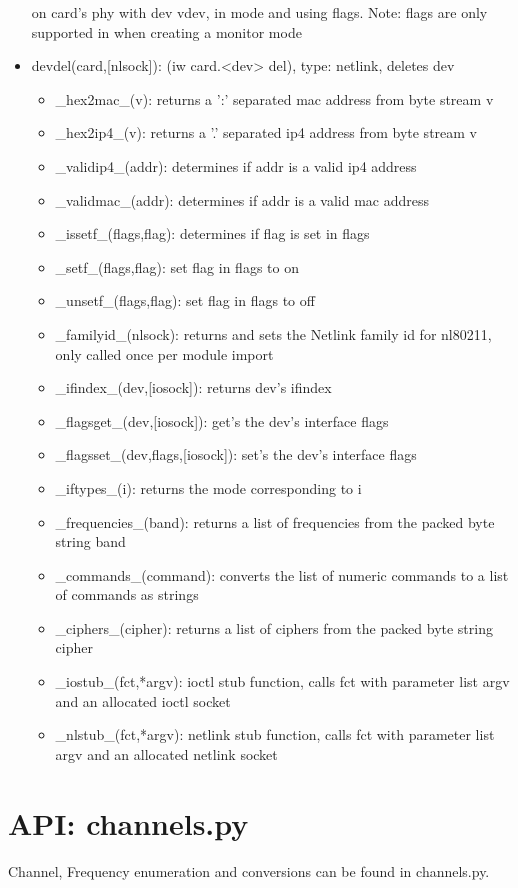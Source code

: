 \documentclass[11pt]{article}
\begin{document}
\begin{appendices}
\begin{itemize}
on card's phy with dev vdev, in mode and using flags. Note: flags are only supported
in when creating a monitor mode
\item devdel(card,[nlsock]): (iw card.<dev> del), type: netlink, deletes dev
\begin{itemize}
\item \_hex2mac\_(v): returns a ':' separated mac address from byte stream v
\item \_hex2ip4\_(v): returns a '.' separated ip4 address from byte stream v
\item \_validip4\_(addr): determines if addr is a valid ip4 address
\item \_validmac\_(addr): determines if addr is a valid mac address
\item \_issetf\_(flags,flag): determines if flag is set in flags
\item \_setf\_(flags,flag): set flag in flags to on
\item \_unsetf\_(flags,flag): set flag in flags to off
\item \_familyid\_(nlsock): returns and sets the Netlink family id for nl80211, 
only called once per module import
\item \_ifindex\_(dev,[iosock]): returns dev's ifindex
\item \_flagsget\_(dev,[iosock]): get's the dev's interface flags
\item \_flagsset\_(dev,flags,[iosock]): set's the dev's interface flags
\item \_iftypes\_(i): returns the mode corresponding to i
\item \_frequencies\_(band): returns a list of frequencies from the packed byte 
string band
\item \_commands\_(command): converts the list of numeric commands to a list of
commands as strings 
\item \_ciphers\_(cipher): returns a list of ciphers from the packed byte string
cipher
\item \_iostub\_(fct,*argv): ioctl stub function, calls fct with parameter list argv
and an allocated ioctl socket
\item \_nlstub\_(fct,*argv): netlink stub function, calls fct with parameter list
argv and an allocated netlink socket
\end{itemize}
\end{itemize}

\section{API: channels.py}\label{sec:channels.api}
Channel, Frequency enumeration and conversions can be found in channels.py.


\end{appendices}
\end{document}
